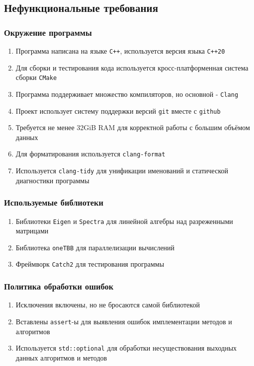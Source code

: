 \documentclass{article}
\begin{document}
\subsection{Нефункциональные требования}
\subsubsection{Окружение программы}
\begin{enumerate}
  \item Программа написана на языке \texttt{C++}, используется версия языка \texttt{C++20}
  \item Для сборки и тестирования кода используется кросс-платформенная система сборки \texttt{CMake}
  \item Программа поддерживает множество компиляторов, но основной - \texttt{Clang}
  \item Проект использует систему поддержки версий \texttt{git} вместе с \texttt{github}
  \item Требуется не менее 32GiB RAM для корректной работы с большим объёмом данных
  \item Для форматирования используется \texttt{clang-format}
  \item Используется \texttt{clang-tidy} для унификации именований и статической диагностики программы
\end{enumerate}
\subsubsection{Используемые библиотеки}
\begin{enumerate}
  \item Библиотеки \texttt{Eigen} \autocite{eigen} и \texttt{Spectra} \autocite{spectra} для линейной алгебры над разреженными матрицами
  \item Библиотека \texttt{oneTBB} \autocite{onetbb} для параллелизации вычислений
  \item Фреймворк \texttt{Catch2} \autocite{catch2} для тестирования программы
\end{enumerate}
\subsubsection{Политика обработки ошибок}
\begin{enumerate}
  \item Исключения включены, но не бросаются самой библиотекой
  \item Вставлены \texttt{assert}-ы для выявления ошибок имплементации методов и алгоритмов
  \item Используется \texttt{std::optional} для обработки несуществования выходных данных алгоритмов и методов
\end{enumerate}
\end{document}
